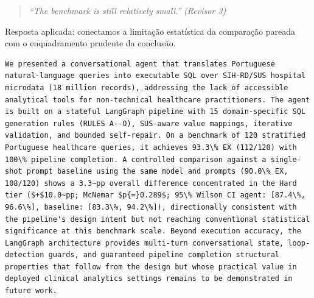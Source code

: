 \documentclass[11pt,a4paper]{article}
\begin{document}
\begin{quote}
\textit{``The benchmark is still relatively small.''}
\hfill\textit{(Revisor 3)}
\end{quote}

\noindent Resposta aplicada: conectamos a limitação estatística da comparação pareada com o enquadramento prudente da conclusão.

\begin{originalblock}
\begin{lstlisting}[style=texsnippet]
We presented a conversational agent that translates Portuguese natural-language queries into executable SQL over SIH-RD/SUS hospital microdata (18 million records), addressing the lack of accessible analytical tools for non-technical healthcare practitioners. The agent is built on a stateful LangGraph pipeline with 15 domain-specific SQL generation rules (RULES A--O), SUS-aware value mappings, iterative validation, and bounded self-repair. On a benchmark of 120 stratified Portuguese healthcare queries, it achieves 93.3\% EX (112/120) with 100\% pipeline completion. A controlled comparison against a single-shot prompt baseline using the same model and prompts (90.0\% EX, 108/120) shows a 3.3~pp overall difference concentrated in the Hard tier ($+$10.0~pp; McNemar $p{=}0.289$; 95\% Wilson CI agent: [87.4\%, 96.6\%], baseline: [83.3\%, 94.2\%]), directionally consistent with the pipeline's design intent but not reaching conventional statistical significance at this benchmark scale. Beyond execution accuracy, the LangGraph architecture provides multi-turn conversational state, loop-detection guards, and guaranteed pipeline completion structural properties that follow from the design but whose practical value in deployed clinical analytics settings remains to be demonstrated in future work.
\end{lstlisting}
\end{originalblock}
\end{document}
